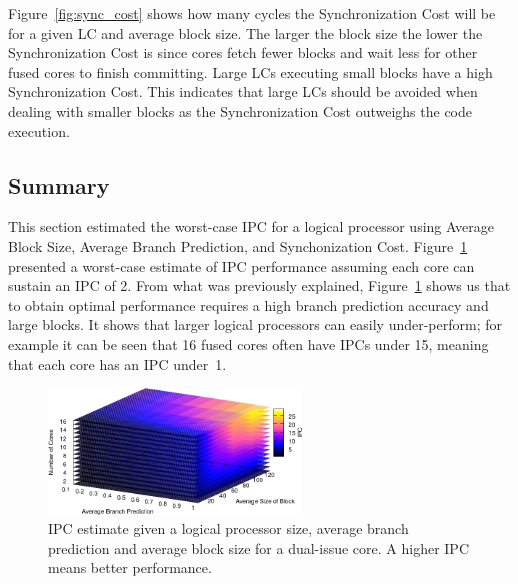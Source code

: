 Figure~\ref{fig:sync_cost} shows how many cycles the Synchronization Cost will be for a given LC and average block size.
The larger the block size the lower the Synchronization Cost is since cores fetch fewer blocks and wait less for other fused cores to finish committing.
Large LCs executing small blocks have a high Synchronization Cost. 
This indicates that large LCs should be avoided when dealing with smaller blocks as the Synchronization Cost outweighs the code execution.

\subsection{Summary}

This section estimated the worst-case IPC for a logical processor using Average Block Size, Average Branch Prediction, and Synchonization Cost.
Figure~\ref{fig:lm_summ} presented a worst-case estimate of IPC performance assuming each core can sustain an IPC of 2.
From what was previously explained, Figure~\ref{fig:lm_summ} shows us that to obtain optimal performance requires a high branch prediction accuracy and large blocks.
It shows that larger logical processors can easily under-perform; for example it can be seen that 16 fused cores often have IPCs under 15, meaning that each core has an IPC under~1.

\begin{figure}[h]
    \centering
    \includegraphics[width=0.60\textwidth]{cases-paper/graphics/limit_study/summary.pdf}
    \caption{IPC estimate given a logical processor size, average branch prediction and average block size for a dual-issue core. A higher IPC means better performance.}
    \label{fig:lm_summ}
\vspace{5mm}
\end{figure}
